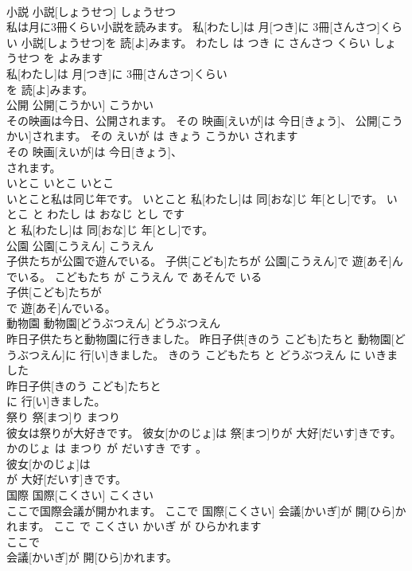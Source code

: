 \documentclass[8pt]{extreport}
\begin{document}
\begin{CJK}{UTF8}{min}
\\	小説	小説[しょうせつ]	しょうせつ	
\\	私は月に3冊くらい小説を読みます。	私[わたし]は 月[つき]に 3冊[さんさつ]くらい 小説[しょうせつ]を 読[よ]みます。	わたし は つき に さんさつ くらい しょうせつ を よみます	
\\	私[わたし]は 月[つき]に 3冊[さんさつ]くらい
\\	を 読[よ]みます。		
\\	公開	公開[こうかい]	こうかい	
\\	その映画は今日、公開されます。	その 映画[えいが]は 今日[きょう]、 公開[こうかい]されます。	その えいが は きょう こうかい されます	
\\	その 映画[えいが]は 今日[きょう]、
\\	されます。		
\\	いとこ	いとこ	いとこ	
\\	いとこと私は同じ年です。	いとこと 私[わたし]は 同[おな]じ 年[とし]です。	いとこ と わたし は おなじ とし です	
\\	と 私[わたし]は 同[おな]じ 年[とし]です。		
\\	公園	公園[こうえん]	こうえん	
\\	子供たちが公園で遊んでいる。	子供[こども]たちが 公園[こうえん]で 遊[あそ]んでいる。	こどもたち が こうえん で あそんで いる	
\\	子供[こども]たちが
\\	で 遊[あそ]んでいる。		
\\	動物園	動物園[どうぶつえん]	どうぶつえん	
\\	昨日子供たちと動物園に行きました。	昨日子供[きのう こども]たちと 動物園[どうぶつえん]に 行[い]きました。	きのう こどもたち と どうぶつえん に いきました	
\\	昨日子供[きのう こども]たちと
\\	に 行[い]きました。		
\\	祭り	祭[まつ]り	まつり	
\\	彼女は祭りが大好きです。	彼女[かのじょ]は 祭[まつ]りが 大好[だいす]きです。	かのじょ は まつり が だいすき です 。	
\\	彼女[かのじょ]は
\\	が 大好[だいす]きです。		
\\	国際	国際[こくさい]	こくさい	
\\	ここで国際会議が開かれます。	ここで 国際[こくさい] 会議[かいぎ]が 開[ひら]かれます。	ここ で こくさい かいぎ が ひらかれます	
\\	ここで
\\	会議[かいぎ]が 開[ひら]かれます。		

\end{CJK}
\end{document}

